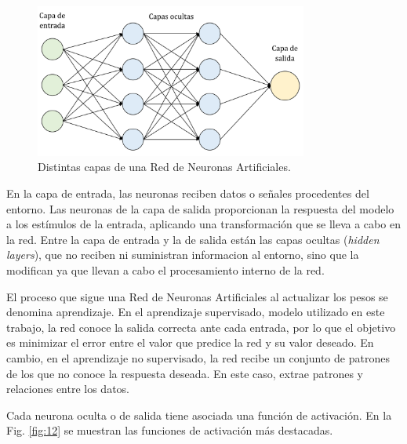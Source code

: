 \documentclass[spanish,a4paper,12pt,twoside]{report}
\begin{document}
    \begin{figure}[H]
      \centering
      \includegraphics[width = 0.8\textwidth]{resources/Fig11.pdf}
      \caption{Distintas capas de una Red de Neuronas Artificiales.}
      \label{fig:11}
    \end{figure} \par
    En la capa de entrada, las neuronas reciben datos o señales procedentes del entorno. Las neuronas de la capa de salida proporcionan la respuesta del modelo a los estímulos de la entrada, aplicando una transformación que se lleva a cabo en la red. Entre la capa de entrada y la de salida están las capas ocultas (\emph{hidden layers}), que no reciben ni suministran informacion al entorno, sino que la modifican ya que llevan a cabo el procesamiento interno de la red. \par
    El proceso que sigue una Red de Neuronas Artificiales al actualizar los pesos se denomina aprendizaje. En el aprendizaje supervisado, modelo utilizado en este trabajo, la red conoce la salida correcta ante cada entrada, por lo que el objetivo es minimizar el error entre el valor que predice la red y su valor deseado. En cambio, en el aprendizaje no supervisado, la red recibe un conjunto de patrones de los que no conoce la respuesta deseada. En este caso, extrae patrones y relaciones entre los datos. \par
    Cada neurona oculta o de salida tiene asociada una función de activación. En la Fig. \ref{fig:12} se muestran las funciones de activación más destacadas.
\end{document}
